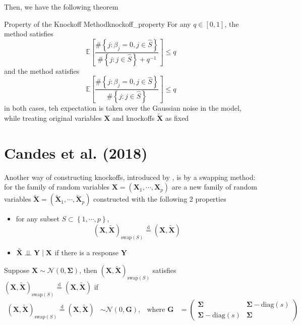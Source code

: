 \documentclass[twoside]{article}
\begin{document}
Then, we have the following theorem
\begin{theorem}{Property of the Knockoff Method}{knockoff_property}
    For any $q\in[0,1]$, the  method satisfies
    $$
    \mathbb{E}\left[ \frac{\# \left\{ j: \beta_j=0, j\in \hat{S}\right\}}{\# \left\{ j: j\in\hat{S} \right\} + q^{-1}} \right]\leq q
    $$
    and the  method satisfies
    $$
    \mathbb{E}\left[ \frac{\# \left\{ j: \beta_j=0, j\in \hat{S}\right\}}{\# \left\{ j: j\in\hat{S} \right\}} \right]\leq q
    $$
    in both cases, teh expectation is taken over the Gaussian noise in the model, while treating original variables $\mathbf{X}$ and knockoffs $\tilde{\mathbf{X}}$ as fixed
\end{theorem}

\section{Candes et al. (2018)}
Another way of constructing knockoffs, introduced by \citet{candes2018panning}, is by a swapping method:  for the family of random variables $\mathbf{X}=(\mathbf{X}_1,\cdots,\mathbf{X}_p)$ are a new family of random variables $\tilde{\mathbf{X}} = (\tilde{\mathbf{X}}_1,\cdots,\tilde{\mathbf{X}}_p)$ constructed with the following 2 properties
\begin{itemize}
    \item for any subset $S \subset \left\{1,\cdots,p \right\}$, $$ (\mathbf{X},\tilde{\mathbf{X}})_{\mathrm{swap}(S)} \overset{\mathrm{d}}{=}(\mathbf{X},\tilde{\mathbf{X}}) $$
    \item $\tilde{\mathbf{X}} \perp\!\!\!\perp \mathbf{Y}\mid \mathbf{X}$ if there is a response $\mathbf{Y}$
\end{itemize}
Suppose $\mathbf{X}\sim \mathcal{N}(0,\boldsymbol{\Sigma})$, then $(\mathbf{X},\tilde{\mathbf{X}})_{\mathrm{swap}(S)}$ satisfies $ (\mathbf{X},\tilde{\mathbf{X}})_{\mathrm{swap}(S)} \overset{\mathrm{d}}{=}(\mathbf{X},\tilde{\mathbf{X}}) $ if 
\begin{align*}
    (\mathbf{X},\tilde{\mathbf{X}})_{\mathrm{swap}(S)} \overset{\mathrm{d}}{=}(\mathbf{X},\tilde{\mathbf{X}}) &\sim \mathcal{N}(0,\mathbf{G}), & \text{where } \mathbf{G}&=\begin{pmatrix}
        \boldsymbol{\Sigma} & \boldsymbol{\Sigma}-\mathrm{diag}(s)\\
        \boldsymbol{\Sigma}-\mathrm{diag}(s) & \boldsymbol{\Sigma}
    \end{pmatrix}
\end{align*}
\end{document}
